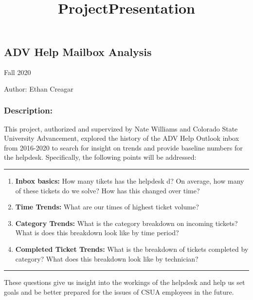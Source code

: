 \documentclass[11pt]{article}
\title{ProjectPresentation}
\begin{document}
    
\begin{center}    
    \LARGE
    \hypertarget{adv-help-mailbox-analysis}{%
\section*{ADV Help Mailbox Analysis}\label{adv-help-mailbox-analysis}}

\normalsize
Fall 2020

Author: Ethan Creagar

\end{center}

\tableofcontents
    \hypertarget{description}{%
\subsubsection{Description:}\label{description}}

This project, authorized and supervized by Nate Williams and Colorado
State University Advancement, explored the history of the ADV Help
Outlook inbox from 2016-2020 to search for insight on trends and provide
baseline numbers for the helpdesk. Specifically, the following points
will be addressed:

\begin{center}\rule{0.5\linewidth}{\linethickness}\end{center}

\begin{enumerate}
\def\labelenumi{\arabic{enumi})}
\item
  \textbf{Inbox basics:} How many tikets has the helpdesk d? On
  average, how many of these tickets do we solve? How has this changed
  over time?
\item
  \textbf{Time Trends:} What are our times of highest ticket volume?
\item
  \textbf{Category Trends:} What is the category breakdown on incoming
  tickets? What is does this breakdown look like by time period?
\item
  \textbf{Completed Ticket Trends:} What is the breakdown of tickets
  completed by category? What does this breakdown look like by
  technician?
\end{enumerate}

\begin{center}\rule{0.5\linewidth}{\linethickness}\end{center}

These questions give us insight into the workings of the helpdesk and
help us set goals and be better prepared for the issues of CSUA
employees in the future.
\end{document}
